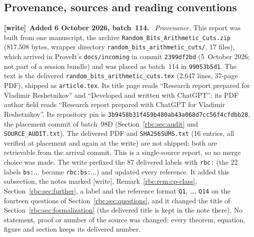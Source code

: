 \documentclass[11pt]{article}
\numberwithin{equation}{section}
\theoremstyle{definition}
\theoremstyle{remark}
\newcommand{\file}[1]{\nolinkurl{#1}}
\newenvironment{writenote}[1][]{\par\smallskip\begingroup\small
 \noindent\textbf{[write]}\if\relax\detokenize{#1}\relax\else~\textbf{#1.}\fi\ }%
 {\par\endgroup\smallskip}
\begin{document}
\subsection{Provenance, sources and reading conventions}\label{rbc:sec:provenance}
\begin{writenote}[Added 6 October 2026, batch~114]
\emph{Provenance.} This report was built from one manuscript, the archive
\file{Random_Bits_Arithmetic_Cuts.zip} (817{,}508 bytes, wrapper directory
\file{random_bits_arithmetic_cuts/}, 17 files), which arrived in ProveIt's
\file{docs/incoming} in commit \file{2399df2bd} (5~October 2026; not part of
a session bundle) and was placed as batch~114 in \file{99053b5d1}. The text
is the delivered \file{random_bits_arithmetic_cuts.tex} (2{,}647 lines,
37-page PDF), shipped as \file{article.tex}. Its title page reads ``Research
report prepared for Vladimir Reshetnikov'' and ``Developed and written with
ChatGPT''; its PDF author field reads ``Research report prepared with ChatGPT
for Vladimir Reshetnikov''. Its repository pin is
\file{3b9458b31f459b480ab43a068d7cc56f4cfdbb28}, the placement commit of
batch~98D (Section~\ref{rbc:sec:audit} and \file{SOURCE_AUDIT.txt}). The
delivered PDF and \file{SHA256SUMS.txt} (16 entries, all verified at
placement and again at the write) are not shipped; both are retrievable from
the arrival commit. This is a single-source report, so no merge choice was
made. The write prefixed the 87 delivered labels with \file{rbc:} (the 22
labels \file{bs:}$\ldots$ became \file{rbc:bs:}$\ldots$) and updated every
reference. It added this subsection, the notes marked [write],
Remark~\ref{rbc:rem:cp-class}, Section~\ref{rbc:sec:further}, a label and
the reference format \file{Q1}, \dots, \file{Q14} on the fourteen questions
of Section~\ref{rbc:sec:questions}, and it changed the title of
Section~\ref{rbc:sec:formalization} (the delivered title is kept in the note
there). No statement, proof or number of the source was changed: every
theorem, equation, figure and section keeps its delivered number.


\end{writenote}
\end{document}
